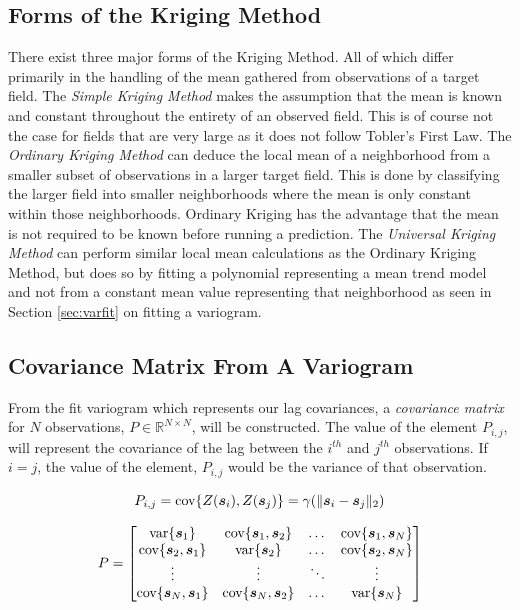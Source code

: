 \subsection{Forms of the Kriging Method}
There exist three major forms of the Kriging Method. All of which differ primarily in the handling of the mean gathered from observations of a target field. The \textit{Simple Kriging Method} makes the assumption that the mean is known and constant throughout the entirety of an observed field. This is of course not the case for fields that are very large as it does not follow Tobler's First Law. The \textit{Ordinary Kriging Method} can deduce the local mean of a neighborhood from a smaller subset of observations in a larger target field. This is done by classifying the larger field into smaller neighborhoods where the mean is only constant within those neighborhoods. Ordinary Kriging has the advantage that the mean is not required to be known before running a prediction. The \textit{Universal Kriging Method} can perform similar local mean calculations as the Ordinary Kriging Method, but does so by fitting a polynomial representing a mean trend model and not from a constant mean value representing that neighborhood \cite{vandergraaf:nnkrig} as seen in Section \ref{sec:varfit} on fitting a variogram.

\subsection{Covariance Matrix From A Variogram} \label{sec:covmat}
From the fit variogram which represents our lag covariances, a \textit{covariance matrix} for $N$ observations, $P \in \mathbb{R}^{N \times N}$, will be constructed. The value of the element $P_{i,j}$, will represent the covariance of the lag between the $i^{th}$ and $j^{th}$ observations. If $i=j$, the value of the element, $P_{i,j}$ would be the variance of that observation. 

\begin{equation}
    P_{i,j} = \text{cov}\{Z({\it{\boldsymbol{s}}}_{i}), Z({\it{\boldsymbol{s}}}_{j})\} = \gamma(\| {\it{\boldsymbol{s}}}_i - {\it{\boldsymbol{s}}}_j \|_2)
    \label{eq:covvarmatelem}
\end{equation}

\begin{equation}
    P = \begin{bmatrix} 

    \text{var}\{{\it{\boldsymbol{s}}}_1\} & \text{cov}\{{\it{\boldsymbol{s}}}_1, {\it{\boldsymbol{s}}}_2\} & \dots & \text{cov}\{{\it{\boldsymbol{s}}}_1, {\it{\boldsymbol{s}}}_N\} \\
    
    \text{cov}\{{\it{\boldsymbol{s}}}_2, {\it{\boldsymbol{s}}}_1\} & \text{var}\{{\it{\boldsymbol{s}}}_2\} & \dots & \text{cov}\{{\it{\boldsymbol{s}}}_2, {\it{\boldsymbol{s}}}_N\} \\

    \vdots & \vdots & \ddots & \vdots  \\
    
    \text{cov}\{{\it{\boldsymbol{s}}}_N, {\it{\boldsymbol{s}}}_1\} & \text{cov}\{{\it{\boldsymbol{s}}}_N, {\it{\boldsymbol{s}}}_2\} & \dots & \text{var}\{{\it{\boldsymbol{s}}}_N\} \\

    \end{bmatrix}
    \label{eq:covvarmat}
\end{equation}

